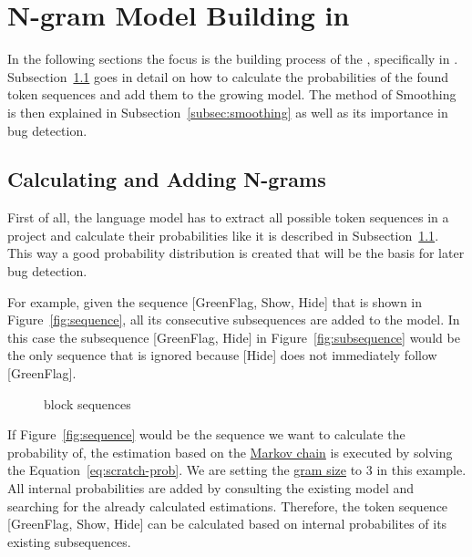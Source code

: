 \section{N-gram Model Building in \scratch{}}\label{sec:model}
In the following sections the focus is the building process of the \ngram{}, specifically in \scratch{}. Subsection~\ref{subsec:n-grams} goes in detail on how to calculate the probabilities of the found token sequences and add them to the growing model. The method of Smoothing is then explained in Subsection~\ref{subsec:smoothing} as well as its importance in bug detection.

\subsection{Calculating and Adding N-grams}\label{subsec:n-grams}
First of all, the language model has to extract all possible token sequences in a \scratch{} project and calculate their probabilities like it is described in Subsection~\ref{subsec:n-grams}. This way a good probability distribution is created that will be the basis for later bug detection. 

For example, given the sequence [GreenFlag, Show, Hide] that is shown in Figure~\ref{fig:sequence}, all its consecutive subsequences are added to the model. In this case the subsequence [GreenFlag, Hide] in Figure~\ref{fig:subsequence} would be the only sequence that is ignored because [Hide] does not immediately follow [GreenFlag]. 

\begin{figure}%
    \centering
    \qquad
    \caption[\scratch{} block sequences]{\label{fig:sequences}\scratch{} block sequences}%
\end{figure}

If Figure~\ref{fig:sequence} would be the sequence we want to calculate the probability of, the estimation based on the \hyperref[def:markov_chain]{Markov chain} is executed by solving the Equation~\ref{eq:scratch-prob}. We are setting the \hyperref[def:gram size]{gram size} to 3 in this example. All internal probabilities are added by consulting the existing model and searching for the already calculated estimations. Therefore, the token sequence [GreenFlag, Show, Hide] can be calculated based on internal probabilites of its existing subsequences.

